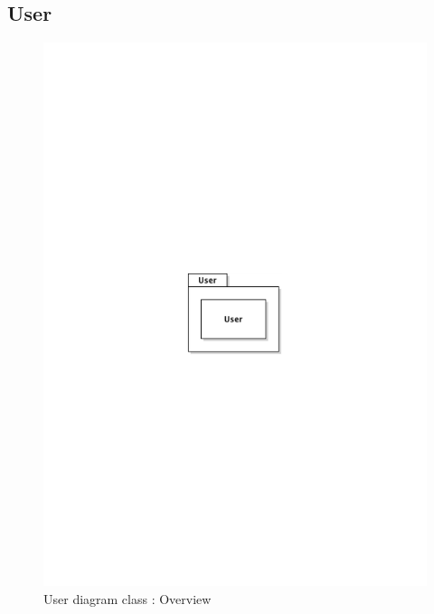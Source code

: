 	\subsection{User}
		\begin{figure}[ht]
			\begin{center}
				\includegraphics[width=\textwidth,  trim=2cm 12cm 2cm 12cm]{UML_figure/DC/core/user/DC_User.pdf}
				\caption{User diagram class : Overview}
			\end{center}
		\end{figure}
\newpage
